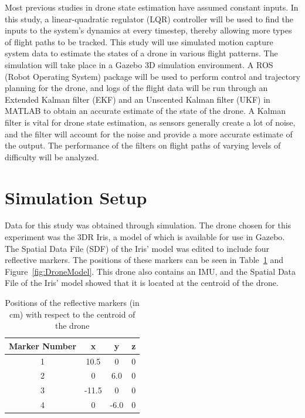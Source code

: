\documentclass[letterpaper, paper,11pt]{AAS}	%
\begin{document}
Most previous studies in drone state estimation have assumed constant inputs\cite{Study, Study2}. In this study, a linear-quadratic regulator (LQR) controller will be used to find the inputs to the system's dynamics at every timestep, thereby allowing more types of flight paths to be tracked. This study will use simulated motion capture system data to estimate the states of a drone in various flight patterns. The simulation will take place in a Gazebo 3D simulation environment\cite{gazebo}. A ROS (Robot Operating System)\cite{ros} package will be used to perform control and trajectory planning for the drone, and logs of the flight data will be run through an Extended Kalman filter (EKF) and an Unscented Kalman filter (UKF) in MATLAB to obtain an accurate estimate of the state of the drone. A Kalman filter is vital for drone state estimation, as sensors generally create a lot of noise, and the filter will account for the noise and provide a more accurate estimate of the output\cite{Alejandro}. The performance of the filters on flight paths of varying levels of difficulty will be analyzed.


\section{Simulation Setup}

Data for this study was obtained through simulation. The drone chosen for this experiment was the 3DR Iris\cite{iris}, a model of which is available for use in Gazebo\cite{gazebo}. The Spatial Data File (SDF) of the Iris' model was edited to include four reflective markers. The positions of these markers can be seen in Table~\ref{tab:DroneModel} and Figure~\ref{fig:DroneModel}. This drone also contains an IMU, and the Spatial Data File of the Iris' model showed that it is located at the centroid of the drone.

\begin{table}[htbp]
	\fontsize{10}{10}\selectfont
    \caption{Positions of the reflective markers (in cm) with respect to the centroid of the drone}
   \label{tab:DroneModel}
        \centering 
   \begin{tabular}{c | c | c | c} %
      \hline 
      Marker Number    & x & y & z \\
      \hline 
      1      & 10.5 & 0 & 0 \\
      2      & 0 & 6.0 & 0 \\
      3      & -11.5 & 0 & 0 \\
      4      & 0 & -6.0 & 0 \\
      \hline
   \end{tabular}
\end{table}
\end{document}

